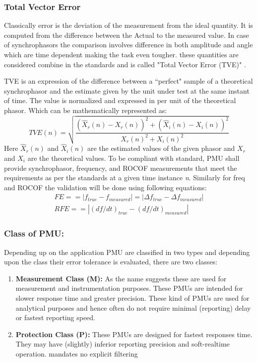 \subsubsection{Total Vector Error}
Classically error is the deviation of the measurement from the ideal quantity. It is computed from the difference between the Actual to the measured value. In case of synchrophasors the comparison involves difference in both amplitude and angle which are time dependent making the task even tougher. these quantities are considered combine in the standards and is called "Total Vector Error (TVE)" \cite{c37.118}.  

TVE is an expression of the difference between a ``perfect" sample of a theoretical synchrophasor and the estimate given by the unit under test at the same instant of time. The value is normalized and expressed in per unit of the theoretical phasor. Which can be mathematically represented as: 
\begin{equation}
TVE(n) = \sqrt{\frac{ (\hat{X}_r(n) - X_r(n))^2 + (\hat{X}_i(n)-X_i(n))^2} {X_r(n)^2 + X_i(n)^2}}
\end{equation}
Here $ \hat{X}_r (n)$ and $\hat{X}_i(n) $ are the estimated values of the given phasor and $X_r$ and $X_i$ are the theoretical values.
To be compliant with standard, PMU shall provide synchrophasor, frequency, and ROCOF measurements that meet the requirements as per the standards at a given time instance \textit{n}. Similarly for freq and ROCOF the validation will be done using following equations:
\begin{eqnarray}
FE == |f_{true}-f_{measured}| = |\Delta f_{true}-\Delta f_{measured}| \\
RFE == |(df/dt)_{true}-(df/dt)_{measured} |
\end{eqnarray}

\subsubsection{Class of PMU:}
Depending up on the application PMU are classified in two types and depending upon the class their error tolerance is evaluated, there are two classes:
\begin{enumerate}
	\item \textbf{Measurement Class (M):} As the name suggests these are used for measurement and instrumentation purposes. These PMUs are intended for slower response time and greater precision. These kind of PMUs are used for analytical purposes and hence often do not require minimal (reporting) delay or fastest reporting speed.
	\item \textbf{Protection Class (P):} These PMUs are designed for fastest responses time. They may have (slightly) inferior reporting precision and soft-realtime operation. 
	mandates no explicit filtering
\end{enumerate} 

